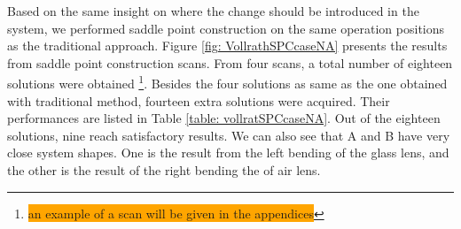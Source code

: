 Based on the same insight on where the change should be introduced in the system, we performed saddle point construction on the same operation positions as the traditional approach. Figure \ref{fig: VollrathSPCcaseNA} presents the results from saddle point construction scans. From four scans, a total number of eighteen solutions were obtained \footnote{\colorbox{orange}{an example of a scan will be given in the appendices}}. Besides the four solutions as same as the one obtained with traditional method, fourteen extra solutions were acquired. Their performances are listed in Table \ref{table: vollratSPCcaseNA}. Out of the eighteen solutions, nine reach satisfactory results. We can also see that A and B have very close system shapes. One is the result from the left bending of the glass lens, and the other is the result of the right bending the of air lens. 

\begin{figure}[h!]
\end{figure}

